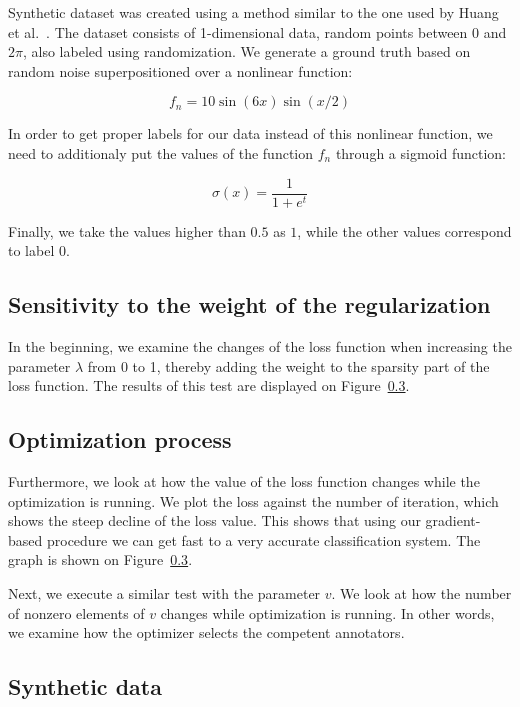 \documentclass{llncs}
\begin{document}
Synthetic dataset was created using a method similar to the one used by Huang et al.~\cite{xiao2013learning}. The dataset consists of 1-dimensional data, random points between $0$ and $2\pi$, also labeled using randomization. We generate a ground truth based on random noise superpositioned over a nonlinear function: 

\begin{equation}
f_n = 10\sin(6x)\sin(x/2)
\end{equation}

In order to get proper labels for our data instead of this nonlinear function, we need to additionaly put the values of the function $f_n$ through a sigmoid function:

\begin{equation}
\sigma(x) = \frac{1}{1+e^t}
\end{equation}

Finally, we take the values higher than $0.5$ as $1$, while the other values correspond to label $0$.

\subsection{Sensitivity to the weight of the regularization}

In the beginning, we examine the changes of the loss function when increasing the parameter $\lambda$ from 0 to 1, thereby adding the weight to the sparsity part of the loss function. The results of this test are displayed on Figure~\ref{}.

\subsection{Optimization process}

Furthermore, we look at how the value of the loss function changes while the optimization is running. We plot the loss against the number of iteration, which shows the steep decline of the loss value. This shows that using our gradient-based procedure we can get fast to a very accurate classification system. The graph is shown on Figure~\ref{}.

Next, we execute a similar test with the parameter $v$. We look at how the number of nonzero elements of $v$ changes while optimization is running. In other words, we examine how the optimizer selects the competent annotators.

\subsection{Synthetic data}
\end{document}
